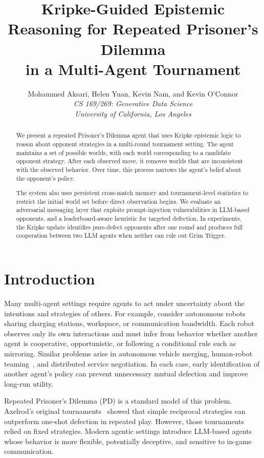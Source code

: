 \documentclass[11pt]{article}
\title{\textbf{Kripke-Guided Epistemic Reasoning for Repeated Prisoner's Dilemma\\
in a Multi-Agent Tournament}}
\author{
Mohammed Aksari, Helen Yuan, Kevin Nam, and Kevin O'Connor \\[4pt]
\textit{CS 169/269: Generative Data Science} \\
\textit{University of California, Los Angeles}
}
\date{}
\begin{document}
\maketitle

\begin{abstract}
We present a repeated Prisoner's Dilemma agent that uses Kripke epistemic logic
to reason about opponent strategies in a multi-round tournament setting. The agent maintains
a set of possible worlds, with each world corresponding to a candidate opponent strategy.
After each observed move, it removes worlds that are inconsistent with the observed behavior.
Over time, this process narrows the agent's belief about the opponent's policy.

The system also uses persistent cross-match memory and tournament-level statistics to restrict
the initial world set before direct observation begins. We evaluate an adversarial messaging
layer that exploits prompt-injection vulnerabilities in LLM-based opponents, and a
leaderboard-aware heuristic for targeted defection. In experiments, the Kripke update
identifies pure-defect opponents after one round and produces full cooperation between two
LLM agents when neither can rule out Grim Trigger.
\end{abstract}

\section{Introduction}

Many multi-agent settings require agents to act under uncertainty about the intentions and
strategies of others. For example, consider autonomous robots sharing charging stations,
workspace, or communication bandwidth. Each robot observes only its own interactions and must
infer from behavior whether another agent is cooperative, opportunistic, or following a
conditional rule such as mirroring. Similar problems arise in autonomous vehicle merging,
human-robot teaming~\cite{baker2017rational}, and distributed service negotiation. In each
case, early identification of another agent's policy can prevent unnecessary mutual defection
and improve long-run utility.

Repeated Prisoner's Dilemma (PD) is a standard model of this problem. Axelrod's original
tournaments~\cite{axelrod1984evolution} showed that simple reciprocal strategies can outperform
one-shot defection in repeated play. However, those tournaments relied on fixed strategies.
Modern agentic settings introduce LLM-based agents whose behavior is more flexible,
potentially deceptive, and sensitive to in-game communication.
\end{document}
